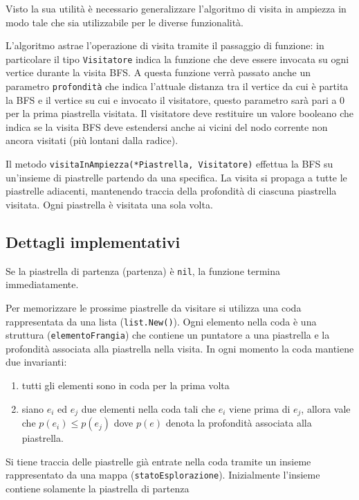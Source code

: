 \documentclass[a4paper,12pt]{article}
\begin{document}
	Visto la sua utilità è necessario generalizzare l'algoritmo di visita in ampiezza in modo tale che sia utilizzabile per le diverse funzionalità.
	
	L'algoritmo astrae l'operazione di visita tramite il passaggio di funzione: in particolare il tipo \texttt{Visitatore} indica la funzione che deve essere invocata su ogni vertice durante la visita BFS.
	A questa funzione verrà passato anche un parametro \texttt{profondità} che indica l'attuale distanza tra il vertice da cui è partita la BFS e il vertice su cui e invocato il visitatore, questo parametro sarà pari a 0 per la prima piastrella visitata.
	Il visitatore deve restituire un valore booleano che indica se la visita BFS deve estendersi anche ai vicini del nodo corrente non ancora visitati (più lontani dalla radice).
	
	Il metodo \texttt{visitaInAmpiezza(*Piastrella, Visitatore)} effettua la BFS su un'insieme di piastrelle partendo da una specifica. 
	La visita si propaga a tutte le piastrelle adiacenti, mantenendo traccia della profondità di ciascuna piastrella visitata.
	Ogni piastrella è visitata una sola volta.
	
	\subsection{Dettagli implementativi}
	Se la piastrella di partenza (partenza) è \texttt{nil}, la funzione termina immediatamente.
	
	Per memorizzare le prossime piastrelle da visitare si utilizza una coda rappresentata da una lista (\texttt{list.New()}).
	Ogni elemento nella coda è una struttura (\texttt{elementoFrangia}) che contiene un puntatore a una piastrella e la profondità associata alla piastrella nella visita.
	In ogni momento la coda mantiene due invarianti: 
	\begin{enumerate}
		\item tutti gli elementi sono in coda per la prima volta
		\item siano \(e_i\) ed \(e_j\) due elementi nella coda tali che \(e_i\) viene prima di \(e_j\), allora vale che \(p(e_i) \le p(e_j)\) dove \(p(e)\) denota la profondità associata alla piastrella.
	\end{enumerate}
	
	Si tiene traccia delle piastrelle già entrate nella coda tramite un insieme rappresentato da una mappa (\texttt{statoEsplorazione}).
	Inizialmente l'insieme contiene solamente la piastrella di partenza
	
\end{document}
